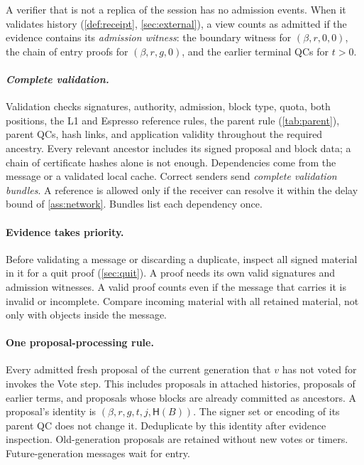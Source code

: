 \documentclass[11pt,a4paper]{article}
\newcommand{\Hash}{\mathsf H}
\newcommand{\defterm}[1]{\textcolor{rrBlue}{\textit{#1}}}
\begin{document}
A verifier that is not a replica of the session has no
admission events. When it validates history (\cref{def:receipt},
\cref{sec:external}), a view counts as admitted if the evidence contains
its \defterm{admission witness}: the boundary witness for $(\beta,r,0,0)$, the chain of
entry proofs for $(\beta,r,g,0)$, and the earlier terminal QCs for $t>0$.

\paragraph{\defterm{Complete validation.}}
Validation checks signatures, authority, admission, block type, quota,
both positions, the L1 and Espresso reference rules, the parent rule
(\cref{tab:parent}), parent QCs, hash links, and application validity
throughout the required ancestry. Every relevant ancestor includes its
signed proposal and block data; a chain of certificate hashes alone is
not enough. Dependencies come from the message or a validated local
cache. Correct senders send \defterm{complete validation bundles}. A reference is
allowed only if the receiver can resolve it within the delay bound of
\cref{ass:network}. Bundles list each dependency once.

\paragraph{Evidence takes priority.}
Before validating a message or discarding a duplicate, inspect all signed
material in it for a quit proof (\cref{sec:quit}). A proof needs its own
valid signatures and admission witnesses. A valid proof counts even if
the message that carries it is invalid or incomplete. Compare incoming
material with all retained material, not only with objects inside the
message.

\paragraph{One proposal-processing rule.}
Every admitted fresh proposal of the current generation that $v$ has not
voted for invokes the Vote step. This includes proposals in attached
histories, proposals of earlier terms, and proposals whose blocks are
already committed as ancestors. A proposal's identity is
$(\beta,r,g,t,j,\Hash(B))$. The signer set or encoding of its parent QC does
not change it. Deduplicate by this identity after evidence inspection.
Old-generation proposals are retained without new votes or timers.
Future-generation messages wait for entry.
\end{document}
